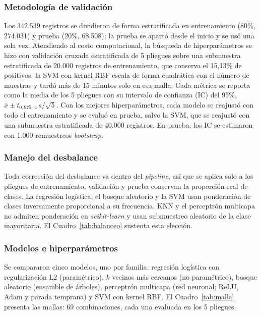 \subsubsection{Metodología de validación}
Los 342.539 registros se dividieron de forma estratificada en entrenamiento (80\%, 274.031) y prueba (20\%, 68.508); la prueba se apartó desde el inicio y se usó una sola vez. Atendiendo al costo computacional, la búsqueda de hiperparámetros se hizo con validación cruzada estratificada de 5 pliegues sobre una submuestra estratificada de 20.000 registros de entrenamiento, que conserva el 15,13\% de positivos: la SVM con kernel RBF escala de forma cuadrática con el número de muestras y tardó más de 15 minutos solo en esa malla. Cada métrica se reporta como la media de los 5 pliegues con su intervalo de confianza (IC) del 95\%, $\bar{x} \pm t_{0{,}975;\,4}\, s/\sqrt{5}$. Con los mejores hiperparámetros, cada modelo se reajustó con todo el entrenamiento y se evaluó en prueba, salvo la SVM, que se reajustó con una submuestra estratificada de 40.000 registros. En prueba, los IC se estimaron con 1.000 remuestreos \textit{bootstrap}.

\subsubsection{Manejo del desbalance}
Toda corrección del desbalance va dentro del \textit{pipeline}, así que se aplica solo a los pliegues de entrenamiento; validación y prueba conservan la proporción real de clases. La regresión logística, el bosque aleatorio y la SVM usan ponderación de clases inversamente proporcional a su frecuencia. KNN y el perceptrón multicapa no admiten ponderación en \textit{scikit-learn} y usan submuestreo aleatorio de la clase mayoritaria. El Cuadro~\ref{tab:balanceo} sustenta esta elección.

\subsubsection{Modelos e hiperparámetros}
Se compararon cinco modelos, uno por familia: regresión logística con regularización L2 (paramétrico), $k$ vecinos más cercanos (no paramétrico), bosque aleatorio (ensamble de árboles), perceptrón multicapa (red neuronal; ReLU, Adam y parada temprana) y SVM con kernel RBF. El Cuadro~\ref{tab:malla} presenta las mallas: 69 combinaciones, cada una evaluada en los 5 pliegues.

